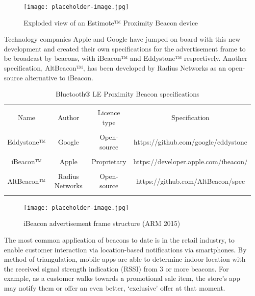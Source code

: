 \begin{figure}
    \centering
    \texttt{[image: placeholder-image.jpg]}
    \caption{Exploded view of an Estimote™ Proximity Beacon device}
    \label{fig:estimote-beacon-explode}
\end{figure}

Technology companies Apple and Google have jumped on board with this new development and created their own specifications for the advertisement frame to be broadcast by beacons, with iBeacon™ and Eddystone™ respectively. Another specification, AltBeacon™, has been developed by Radius Networks as an open-source alternative to iBeacon.

\begin{table}
    \centering
    \begin{tabular}{cccc}
        \hline \\
        Name & Author & Licence type & Specification \\
        \hline \\
        Eddystone™ & Google & Open-source & https://github.com/google/eddystone\\
        \hline \\
        iBeacon™ & Apple & Proprietary & https://developer.apple.com/ibeacon/ \\
        \hline \\
        AltBeacon™ & Radius Networks & Open-source &    https://github.com/AltBeacon/spec \\
        \hline \\
    \end{tabular}
    \caption{Bluetooth® LE Proximity Beacon specifications}
    \label{tab:ble-proximity-beacons}
\end{table}

\begin{figure}
    \centering
    \texttt{[image: placeholder-image.jpg]}
    \caption{iBeacon advertisement frame structure (ARM 2015)}
    \label{fig:ibeacon-ad-frame}
\end{figure}

The most common application of beacons to date is in the retail industry, to enable customer interaction via location-based notifications via smartphones. By method of triangulation, mobile apps are able to determine indoor location with the received signal strength indication (RSSI) from 3 or more beacons. For example, as a customer walks towards a promotional sale item, the store’s app may notify them or offer an even better, ‘exclusive’ offer at that moment.

